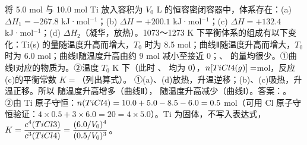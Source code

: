 \begin{liti}
将 5.0 mol  与 10.0 mol Ti 放入容积为 $V_0$ L 的恒容密闭容器中，体系存在：(a) $\Delta H_1=-267.8$ kJ·mol$^{-1}$；(b) $\Delta H=+200.1$ kJ·mol$^{-1}$；(c) $\Delta H=+132.4$ kJ·mol$^{-1}$；(d) $\Delta H_2$（凝华，放热）。1073～1273 K 下平衡体系的组成有以下变化：Ti(s) 的量随温度升高而增大，$T_0$ 时为 8.5 mol；曲线Ⅱ随温度升高而增大，$T_0$ 时为 6.0 mol；曲线Ⅰ随温度升高由约 9 mol 减小至接近 0；、 的量均很少。①曲线Ⅰ对应的物质为\tk。②温度 $T_0$ K 下（此时 、 均为 0），$n[TiCl4(g)]=$\tk mol，反应(c)的平衡常数 $K=$\tk（列出算式）。
\tcblower
\jie ①(a)、(d)放热，升温逆移；(b)、(c)吸热，升温正移。所以  随温度升高增多（曲线Ⅱ）， 随温度升高减少（曲线Ⅰ）。答案：。\\
②由 Ti 原子守恒：$n(TiCl4)=10.0+5.0-8.5-6.0=0.5$ mol（可用 Cl 原子守恒验证：$4\times0.5+3\times6.0=20=4\times5.0$）。Ti 为固体，不写入表达式，$K=\dfrac{c^4(TiCl3)}{c^3(TiCl4)}=\dfrac{(6.0/V_0)^4}{(0.5/V_0)^3}$。
\end{liti}


